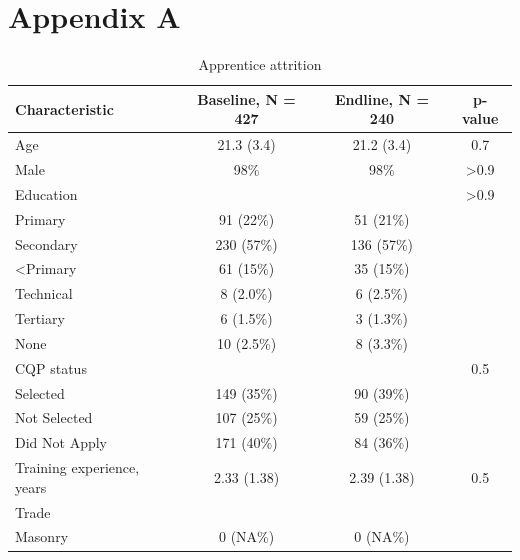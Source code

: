 \documentclass[
  11pt,
a4paper
]{article}
\begin{document}
\hypertarget{appendix-appendix}{%
\appendix}


\hypertarget{appendix-a}{%
\section*{Appendix A}\label{appendix-a}}

\setcounter{figure}{0}
\renewcommand{\thefigure}{A\arabic{figure}}
\setcounter{table}{0}
\renewcommand{\thetable}{A\arabic{table}}

\begin{table}[H]

\caption{\label{tab:tbl-attritionapps}Apprentice attrition}
\centering
\begin{tabular}[t]{lccc}
\toprule
\textbf{Characteristic} & \textbf{Baseline}, N = 427 & \textbf{Endline}, N = 240 & \textbf{p-value}\\
\midrule
Age & 21.3 (3.4) & 21.2 (3.4) & 0.7\\
Male & 98\% & 98\% & >0.9\\
Education &  &  & >0.9\\
\hspace{1em}Primary & 91 (22\%) & 51 (21\%) & \\
\hspace{1em}Secondary & 230 (57\%) & 136 (57\%) & \\
\hspace{1em}<Primary & 61 (15\%) & 35 (15\%) & \\
\hspace{1em}Technical & 8 (2.0\%) & 6 (2.5\%) & \\
\hspace{1em}Tertiary & 6 (1.5\%) & 3 (1.3\%) & \\
\hspace{1em}None & 10 (2.5\%) & 8 (3.3\%) & \\
CQP status &  &  & 0.5\\
\hspace{1em}Selected & 149 (35\%) & 90 (39\%) & \\
\hspace{1em}Not Selected & 107 (25\%) & 59 (25\%) & \\
\hspace{1em}Did Not Apply & 171 (40\%) & 84 (36\%) & \\
Training experience, years & 2.33 (1.38) & 2.39 (1.38) & 0.5\\
Trade &  &  & \\
\hspace{1em}Masonry & 0 (NA\%) & 0 (NA\%) & \\

\end{tabular}
\end{table}
\end{document}
